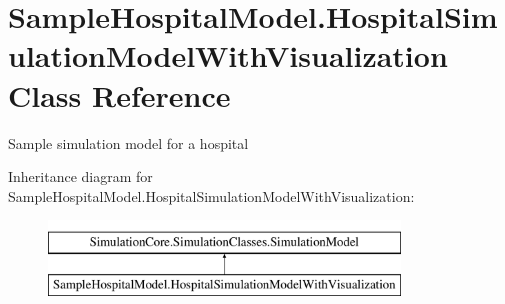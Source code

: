 \hypertarget{class_sample_hospital_model_1_1_hospital_simulation_model_with_visualization}{}\section{Sample\+Hospital\+Model.\+Hospital\+Simulation\+Model\+With\+Visualization Class Reference}
\label{class_sample_hospital_model_1_1_hospital_simulation_model_with_visualization}


Sample simulation model for a hospital  


Inheritance diagram for Sample\+Hospital\+Model.\+Hospital\+Simulation\+Model\+With\+Visualization\+:\begin{figure}[H]
\begin{center}
\leavevmode
\includegraphics[height=2.000000cm]{class_sample_hospital_model_1_1_hospital_simulation_model_with_visualization}
\end{center}
\end{figure}
